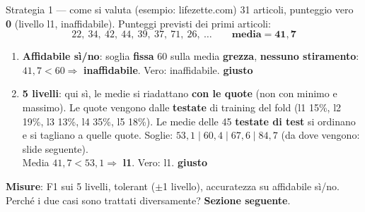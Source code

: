 \documentclass[aspectratio=169]{beamer}
\newcommand{\hl}[1]{\textbf{#1}}
\newcommand{\si}{\textcolor{verde}{\textbf{giusto}}}
\begin{document}
\begin{frame}{Strategia 1 --- come si valuta (esempio: lifezette.com)}
  \small
  31 articoli, punteggio vero \hl{0} (livello l1, inaffidabile). Punteggi previsti dei primi articoli:
  \[ 22,\ 34,\ 42,\ 44,\ 39,\ 37,\ 71,\ 26,\ \ldots \qquad \textbf{media} = \mathbf{41{,}7} \]
  \begin{enumerate}
    \setlength\itemsep{0.6em}
    \item \hl{Affidabile s\`i/no}: soglia \hl{fissa} 60 sulla media \hl{grezza}, \hl{nessuno stiramento}:
          $41{,}7 < 60 \Rightarrow$ \textbf{inaffidabile}. Vero: inaffidabile. \si
    \item \hl{5 livelli}: qui s\`i, le medie si riadattano \hl{con le quote} (non con minimo e massimo). Le quote vengono dalle
          \hl{testate} di training del fold (l1 15\%, l2 19\%, l3 13\%, l4 35\%, l5 18\%). Le medie delle 45 \hl{testate di test}
          si ordinano e si tagliano a quelle quote. Soglie: $53{,}1 \mid 60{,}4 \mid 67{,}6 \mid 84{,}7$ (da dove vengono:
          slide seguente).\\
          Media $41{,}7 <53{,}1 \Rightarrow$ \textbf{l1}. Vero: l1. \si
  \end{enumerate}
  \vspace{0.4em}
  \raggedright
  \hl{Misure}: F1 sui 5 livelli, tolerant ($\pm$1 livello), accuratezza su affidabile s\`i/no.\\
  Perch\'e i due casi sono trattati diversamente? \hl{Sezione seguente}.
\end{frame}
\end{document}
